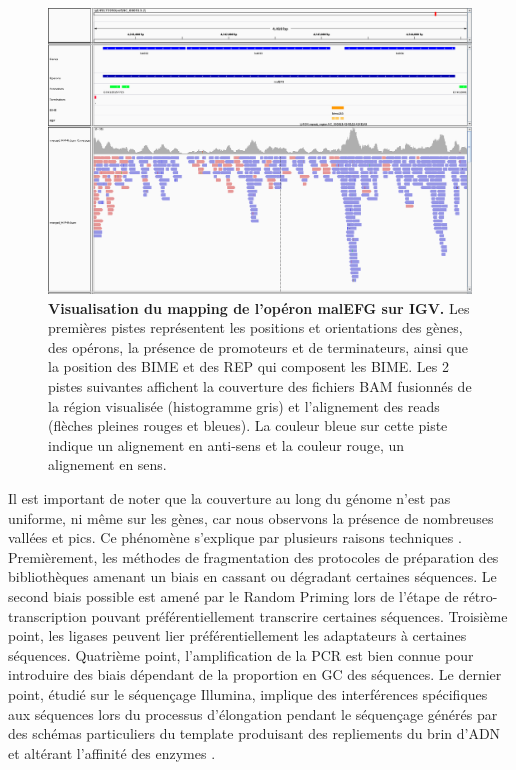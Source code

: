 \documentclass[12pt,a4paper]{report}
\begin{document}
\begin{onehalfspace}
\begin{figure}[ht]
\centerline{\includegraphics[scale=0.27]{figures/igv_snapshot.png}}
\caption{\textbf{Visualisation du mapping de l'opéron malEFG sur IGV.} Les premières pistes représentent les positions et orientations des gènes, des opérons, la présence de promoteurs et de terminateurs, ainsi que la position des BIME et des REP qui composent les BIME. Les 2 pistes suivantes affichent la couverture des fichiers BAM fusionnés de la région visualisée (histogramme gris) et l'alignement des reads (flèches pleines rouges et bleues). La couleur bleue sur cette piste indique un alignement en anti-sens et la couleur rouge, un alignement en sens.}
\label{fig:igv} 
\end{figure}

Il est important de noter que la couverture au long du génome n'est pas uniforme, ni même sur les gènes, car nous observons la présence de nombreuses vallées et pics. Ce phénomène s'explique par plusieurs raisons techniques \citep{Li2013}. Premièrement, les méthodes de fragmentation des protocoles de préparation des bibliothèques amenant un biais en cassant ou dégradant certaines séquences. Le second biais possible est amené par le Random Priming lors de l'étape de rétro-transcription pouvant préférentiellement transcrire certaines séquences. Troisième point, les ligases peuvent lier préférentiellement les adaptateurs à certaines séquences. Quatrième point, l'amplification de la PCR est bien connue pour introduire des biais dépendant de la proportion en GC des séquences. Le dernier point, étudié sur le séquençage Illumina, implique des interférences spécifiques aux séquences lors du processus d'élongation pendant le séquençage générés par des schémas particuliers du template produisant des repliements du brin d'ADN et altérant l'affinité des enzymes \citep{Nakamura2011}.


\end{onehalfspace}
\end{document}
